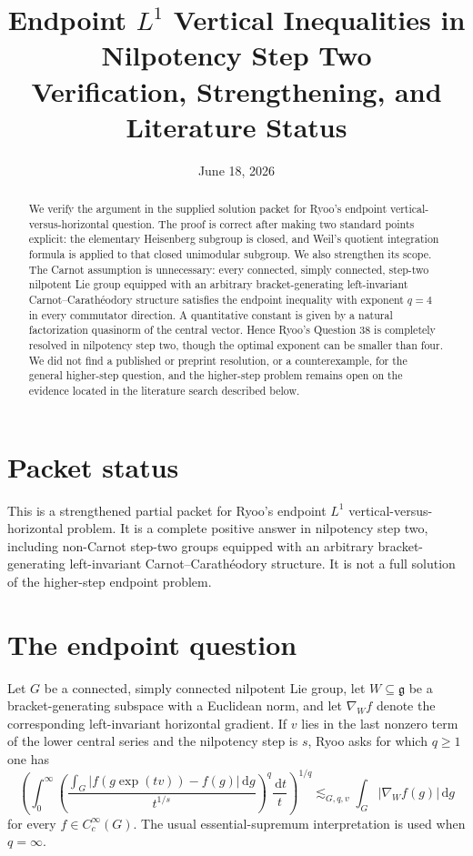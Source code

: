 \documentclass[11pt]{article}
\title{Endpoint \(L^1\) Vertical Inequalities in Nilpotency Step Two\\
Verification, Strengthening, and Literature Status}
\author{}
\date{June 18, 2026}
\theoremstyle{remark}
\newcommand{\g}{\mathfrak g}
\newcommand{\dd}{\,\mathrm d}
\newcommand{\abs}[1]{\lvert #1\rvert}
\begin{document}
\maketitle

\begin{abstract}
We verify the argument in the supplied solution packet for Ryoo's endpoint
vertical-versus-horizontal question.  The proof is correct after making two standard
points explicit: the elementary Heisenberg subgroup is closed, and Weil's quotient
integration formula is applied to that closed unimodular subgroup.  We also strengthen
its scope.  The Carnot assumption is unnecessary: every connected, simply connected,
step-two nilpotent Lie group equipped with an arbitrary bracket-generating left-invariant
Carnot--Carath\'eodory structure satisfies the endpoint inequality with exponent \(q=4\)
in every commutator direction.  A quantitative constant is given by a natural factorization
quasinorm of the central vector.  Hence Ryoo's Question 38 is completely resolved in
nilpotency step two, though the optimal exponent can be smaller than four.  We did not
find a published or preprint resolution, or a counterexample, for the general higher-step
question, and the higher-step problem remains open on the evidence located in the
literature search described below.
\end{abstract}

\section*{Packet status}

This is a strengthened partial packet for Ryoo's endpoint \(L^1\)
vertical-versus-horizontal problem.  It is a complete positive answer in nilpotency
step two, including non-Carnot step-two groups equipped with an arbitrary
bracket-generating left-invariant Carnot--Carath\'eodory structure.  It is not a
full solution of the higher-step endpoint problem.

\section{The endpoint question}
Let \(G\) be a connected, simply connected nilpotent Lie group, let \(W\subseteq\g\)
be a bracket-generating subspace with a Euclidean norm, and let \(\nabla_W f\) denote
the corresponding left-invariant horizontal gradient.  If \(v\) lies in the last nonzero
term of the lower central series and the nilpotency step is \(s\), Ryoo asks for which
\(q\geq 1\) one has
\begin{equation}\label{eq:Ryoo}
 \left(\int_0^\infty
 \left(\frac{\displaystyle\int_G
 \abs{f(g\exp(tv))-f(g)}\dd g}{t^{1/s}}\right)^q
 \frac{\dd t}{t}\right)^{1/q}
 \lesssim_{G,q,v}\int_G\abs{\nabla_W f(g)}\dd g
\end{equation}
for every \(f\in C_c^\infty(G)\).  The usual essential-supremum interpretation is used
when \(q=\infty\).
\end{document}

